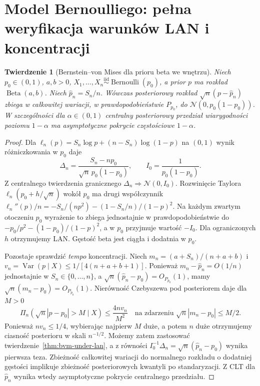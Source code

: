 \documentclass[11pt,a4paper,oneside]{report}
\numberwithin{equation}{chapter}
\theoremstyle{plain}
\newtheorem{twierdzenie}{Twierdzenie}[chapter]
\theoremstyle{definition}
\theoremstyle{remark}
\newcommand{\Var}{\operatorname{Var}}
\newcommand{\Normal}{\mathcal N}
\newcommand{\iid}{\mathrel{\overset{\mathrm{iid}}\sim}}
\begin{document}
\section{Model Bernoulliego: pełna weryfikacja warunków LAN i koncentracji}
\begin{twierdzenie}[Bernstein--von Mises dla prioru beta we wnętrzu]
\label{thm:bernoulli-bvm}
Niech $p_0\in(0,1)$, $a,b>0$,
$X_1,\ldots,X_n\iid\operatorname{Bernoulli}(p_0)$,
a prior $p$ ma rozkład $\operatorname{Beta}(a,b)$.
Niech $\widehat p_n=S_n/n$. Wówczas posteriorowy rozkład
$\sqrt n(p-\widehat p_n)$ zbiega w całkowitej wariacji,
w prawdopodobieństwie $P_{p_0}$, do
$\Normal(0,p_0(1-p_0))$.
W szczególności dla $\alpha\in(0,1)$ centralny
posteriorowy przedział wiarygodności poziomu $1-\alpha$
ma asymptotyczne pokrycie częstościowe $1-\alpha$.
\end{twierdzenie}
\begin{proof}
Dla $\ell_n(p)=S_n\log p+(n-S_n)\log(1-p)$
na $(0,1)$ wynik różniczkowania w $p_0$ daje
\[
 \Delta_n=\frac{S_n-np_0}{\sqrt n\,p_0(1-p_0)},
 \qquad I_0=\frac1{p_0(1-p_0)}.
\]
Z centralnego twierdzenia granicznego
$\Delta_n\Rightarrow\Normal(0,I_0)$.
Rozwinięcie Taylora $\ell_n(p_0+h/\sqrt n)$ wokół $p_0$
ma drugi współczynnik
$\ell_n''(p)/n=-S_n/(np^2)-(1-S_n/n)/(1-p)^2$.
Na każdym zwartym otoczeniu $p_0$ wyrażenie to zbiega
jednostajnie w prawdopodobieństwie do
$-p_0/p^2-(1-p_0)/(1-p)^2$, a w $p_0$ przyjmuje
wartość $-I_0$. Dla ograniczonych $h$ otrzymujemy LAN.
Gęstość beta jest ciągła i dodatnia w $p_0$.

Pozostaje sprawdzić \emph{tempo} koncentracji.
Niech $m_n=(a+S_n)/(n+a+b)$ i
$v_n=\Var(p\mid X)\le1/[4(n+a+b+1)]$.
Ponieważ $m_n-\widehat p_n=O(1/n)$ jednostajnie
w $S_n\in\{0,\ldots,n\}$, a
$\sqrt n(\widehat p_n-p_0)=O_{P_{p_0}}(1)$,
mamy $\sqrt n(m_n-p_0)=O_{P_{p_0}}(1)$.
Nierówność Czebyszewa pod posteriorem daje dla $M>0$
\[
 \Pi_n(\sqrt n|p-p_0|>M\mid X)
 \le\frac{4nv_n}{M^2}
 \quad\text{na zdarzeniu }\sqrt n|m_n-p_0|\le M/2.
\]
Ponieważ $nv_n\le1/4$, wybierając najpierw $M$ duże,
a potem $n$ duże otrzymujemy ciasność posterioru
w skali $n^{-1/2}$. Możemy zatem zastosować
twierdzenie~\ref{thm:bvm-under-lan}, a z równości
$I_0^{-1}\Delta_n=\sqrt n(\widehat p_n-p_0)$
wynika pierwsza teza.
Zbieżność całkowitej wariacji do normalnego rozkładu
o dodatniej gęstości implikuje zbieżność posteriorowych
kwantyli po standaryzacji. Z CLT dla $\widehat p_n$
wynika wtedy asymptotyczne pokrycie centralnego
przedziału.
\end{proof}
\end{document}
